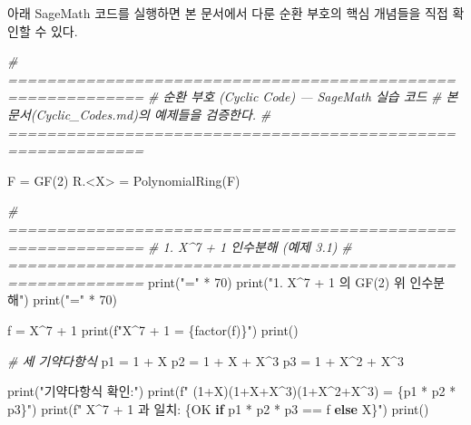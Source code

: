 \documentclass[
  oneside]{article}
\newenvironment{Shaded}{}{}
\newcommand{\BuiltInTok}[1]{\textcolor[rgb]{0.00,0.50,0.00}{#1}}
\newcommand{\CommentTok}[1]{\textcolor[rgb]{0.38,0.63,0.69}{\textit{#1}}}
\newcommand{\ControlFlowTok}[1]{\textcolor[rgb]{0.00,0.44,0.13}{\textbf{#1}}}
\newcommand{\DecValTok}[1]{\textcolor[rgb]{0.25,0.63,0.44}{#1}}
\newcommand{\NormalTok}[1]{#1}
\newcommand{\OperatorTok}[1]{\textcolor[rgb]{0.40,0.40,0.40}{#1}}
\newcommand{\SpecialCharTok}[1]{\textcolor[rgb]{0.25,0.44,0.63}{#1}}
\newcommand{\SpecialStringTok}[1]{\textcolor[rgb]{0.73,0.40,0.53}{#1}}
\newcommand{\StringTok}[1]{\textcolor[rgb]{0.25,0.44,0.63}{#1}}
\begin{document}
아래 SageMath 코드를 실행하면 본 문서에서 다룬 순환 부호의 핵심 개념들을
직접 확인할 수 있다.

\begin{Shaded}
\begin{Highlighting}[]
\CommentTok{\# ============================================================}
\CommentTok{\# 순환 부호 (Cyclic Code) — SageMath 실습 코드}
\CommentTok{\# 본 문서(Cyclic\_Codes.md)의 예제들을 검증한다.}
\CommentTok{\# ============================================================}

\NormalTok{F }\OperatorTok{=}\NormalTok{ GF(}\DecValTok{2}\NormalTok{)}
\NormalTok{R.}\OperatorTok{\textless{}}\NormalTok{X}\OperatorTok{\textgreater{}} \OperatorTok{=}\NormalTok{ PolynomialRing(F)}

\CommentTok{\# ============================================================}
\CommentTok{\# 1. X\^{}7 + 1 인수분해 (예제 3.1)}
\CommentTok{\# ============================================================}
\BuiltInTok{print}\NormalTok{(}\StringTok{"="} \OperatorTok{*} \DecValTok{70}\NormalTok{)}
\BuiltInTok{print}\NormalTok{(}\StringTok{"1. X\^{}7 + 1 의 GF(2) 위 인수분해"}\NormalTok{)}
\BuiltInTok{print}\NormalTok{(}\StringTok{"="} \OperatorTok{*} \DecValTok{70}\NormalTok{)}

\NormalTok{f }\OperatorTok{=}\NormalTok{ X}\OperatorTok{\^{}}\DecValTok{7} \OperatorTok{+} \DecValTok{1}
\BuiltInTok{print}\NormalTok{(}\SpecialStringTok{f"X\^{}7 + 1 = }\SpecialCharTok{\{}\NormalTok{factor(f)}\SpecialCharTok{\}}\SpecialStringTok{"}\NormalTok{)}
\BuiltInTok{print}\NormalTok{()}

\CommentTok{\# 세 기약다항식}
\NormalTok{p1 }\OperatorTok{=} \DecValTok{1} \OperatorTok{+}\NormalTok{ X}
\NormalTok{p2 }\OperatorTok{=} \DecValTok{1} \OperatorTok{+}\NormalTok{ X }\OperatorTok{+}\NormalTok{ X}\OperatorTok{\^{}}\DecValTok{3}
\NormalTok{p3 }\OperatorTok{=} \DecValTok{1} \OperatorTok{+}\NormalTok{ X}\OperatorTok{\^{}}\DecValTok{2} \OperatorTok{+}\NormalTok{ X}\OperatorTok{\^{}}\DecValTok{3}

\BuiltInTok{print}\NormalTok{(}\StringTok{"기약다항식 확인:"}\NormalTok{)}
\BuiltInTok{print}\NormalTok{(}\SpecialStringTok{f"  (1+X)(1+X+X\^{}3)(1+X\^{}2+X\^{}3) = }\SpecialCharTok{\{}\NormalTok{p1 }\OperatorTok{*}\NormalTok{ p2 }\OperatorTok{*}\NormalTok{ p3}\SpecialCharTok{\}}\SpecialStringTok{"}\NormalTok{)}
\BuiltInTok{print}\NormalTok{(}\SpecialStringTok{f"  X\^{}7 + 1 과 일치: }\SpecialCharTok{\{}\StringTok{\textquotesingle{}OK\textquotesingle{}} \ControlFlowTok{if}\NormalTok{ p1 }\OperatorTok{*}\NormalTok{ p2 }\OperatorTok{*}\NormalTok{ p3 }\OperatorTok{==}\NormalTok{ f }\ControlFlowTok{else} \StringTok{\textquotesingle{}X\textquotesingle{}}\SpecialCharTok{\}}\SpecialStringTok{"}\NormalTok{)}
\BuiltInTok{print}\NormalTok{()}


\end{Highlighting}
\end{Shaded}
\end{document}
